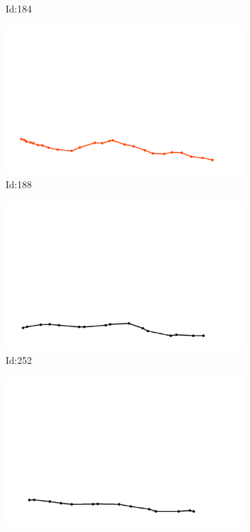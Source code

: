 \documentclass[12pt,twoside]{report}
\begin{document}
\begin{figure}
\begin{subfigure}[b]{0.20\textwidth}
\caption{Id:184}
\end{subfigure}
\begin{subfigure}[b]{0.20\textwidth}
\centering
\includegraphics[width=\textwidth]{../../trajectories/188.png}
\caption{Id:188}
\end{subfigure}
\begin{subfigure}[b]{0.20\textwidth}
\centering
\includegraphics[width=\textwidth]{../../trajectories/252.png}
\caption{Id:252}
\end{subfigure}
\begin{subfigure}[b]{0.20\textwidth}
\centering
\includegraphics[width=\textwidth]{../../trajectories/378.png}

\end{subfigure}
\end{figure}
\end{document}
